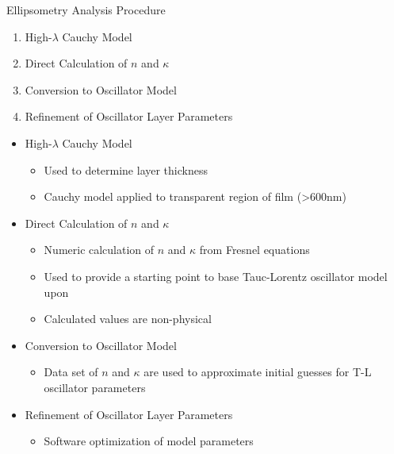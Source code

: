 \documentclass[professionalfont]{beamer}
\begin{document}
\begin{frame}{Ellipsometry Analysis Procedure}
\begin{overprint}
	\Large
	\begin{enumerate}
	\item
	High-$\lambda$ Cauchy Model
	\item
	Direct Calculation of $n$ and $\kappa$
	\item
	Conversion to Oscillator Model
	\item
	Refinement of Oscillator Layer Parameters
	\end{enumerate}
	\begin{itemize}
		\item High-$\lambda$ Cauchy Model
		\begin{itemize}
			\large
			\item Used to determine layer thickness
			\item Cauchy model applied to transparent region of film (>600nm)
		\end{itemize}
	\end{itemize}
	\begin{itemize}
		\item Direct Calculation of $n$ and $\kappa$
		\begin{itemize}
			\large
			\item Numeric calculation of $n$ and $\kappa$ from Fresnel equations
			\item Used to provide a starting point to base Tauc-Lorentz oscillator model upon
			\item Calculated values are non-physical
		\end{itemize}
	\end{itemize}
	\begin{itemize}
		\item Conversion to Oscillator Model
		\begin{itemize}
			\large
			\item Data set of $n$ and $\kappa$ are used to approximate initial guesses for %
			T-L oscillator parameters 
		\end{itemize}
	\end{itemize}
	\begin{itemize}
		\item Refinement of Oscillator Layer Parameters
		\begin{itemize}
			\large
			\item Software optimization of model parameters
		\end{itemize}
	\end{itemize}
\end{overprint}
\end{frame}
\end{document}
